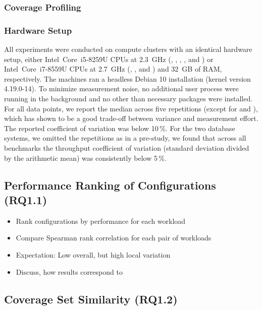 \subsubsection{Coverage Profiling}\label{sec:profiling}

\subsubsection{Hardware Setup}
All experiments were conducted on compute clusters with an identical hardware setup, either Intel~Core~i5-8259U CPUs at 2.3~GHz (, , , , and ) or Intel~Core~i7-8559U CPUs at 2.7~GHz (, , and ) and 32~GB of RAM, respectively. The machines ran a headless Debian 10 installation (kernel version \mbox{4.19.0-14}). To minimize measurement noise, no additional user process were running in the background and no other than necessary packages were installed.
For all data points, we report the median across five repetitions (except for  and ), which has shown to be a good trade-off between variance and measurement effort. The reported coefficient of variation was below {\color{Red}10\,\%}. For the two database systems, we omitted the repetitions as in a pre-study, we found that across all benchmarks the throughput coefficient of variation (standard deviation divided by the arithmetic mean) was consistently below 5\,\%.

\subsection{Performance Ranking of Configurations (RQ1.1)}
{\color{teal}
\begin{itemize}
	\item Rank configurations by performance for each workload
	\item Compare Spearman rank correlation for each pair of workloads
	\item Expectation: Low overall, but high local variation
	\item Discuss, how results correspond to~\cite{jamishidi_transfer_2017}
\end{itemize}
}

\subsection{Coverage Set Similarity (RQ1.2)}


